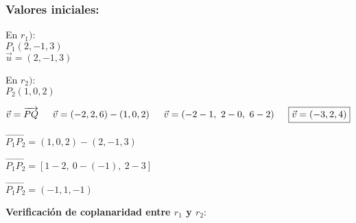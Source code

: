 \subsubsection*{Valores iniciales:}

\begin{multicols}{2}
	\noindent En $r_1)$: \\
	\indent $\boxed{P_1(2, -1, 3)}$ \\
	\indent $\boxed{\vec{u}=(2, -1, 3)}$

	\columnbreak
	\noindent En $r_2)$: \\
	\indent $\boxed{P_2(1, 0, 2)}$

	\indent $\vec{v}  =\overrightarrow{PQ}     \\
		\indent \vec{v}  = (-2, 2, 6) - (1, 0, 2) \\
		\indent \vec{v}  =(-2-1, \ 2-0, \ 6-2)    \\
		\indent \boxed{\vec{v}  =(-3,2,4)}$
\end{multicols}

\noindent $\overrightarrow{P_1P_2} = (1, 0, 2) - (2, -1, 3)$

\noindent $\overrightarrow{P_1P_2} = [1 - 2, \ 0 - (-1), \ 2 - 3]$

\noindent $\boxed{\overrightarrow{P_1P_2} = (-1, 1, -1)}$
\vspace{1cm}

\noindent \textbf{Verificación de coplanaridad entre $r_1$ y $r_2$}:

